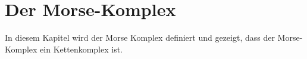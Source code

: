 \chapter{Der Morse-Komplex}

In diesem Kapitel wird der Morse Komplex definiert und gezeigt, dass der 
Morse-Komplex ein Kettenkomplex ist.